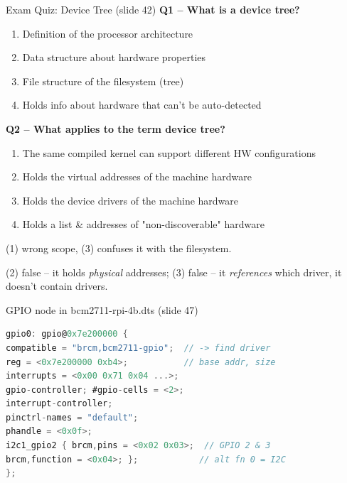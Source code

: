 \begin{example2}{Exam Quiz: Device Tree (slide 42)}
    \textbf{Q1 -- What is a device tree?}
    \begin{enumerate}
        \item Definition of the processor architecture
        \item Data structure about hardware properties
        \item File structure of the filesystem (tree)
        \item Holds info about hardware that can't be auto-detected
    \end{enumerate}
    \textbf{Q2 -- What applies to the term device tree?}
    \begin{enumerate}
        \item The same compiled kernel can support different HW configurations
        \item Holds the virtual addresses of the machine hardware
        \item Holds the device drivers of the machine hardware
        \item Holds a list \& addresses of "non-discoverable" hardware
    \end{enumerate}
    \tcblower
     (1) wrong scope, (3) confuses it with the filesystem.

     (2) false -- it holds \emph{physical} addresses;
    (3) false -- it \emph{references} which driver, it doesn't contain drivers.
\end{example2}

\begin{examplecode}{GPIO node in bcm2711-rpi-4b.dts (slide 47)}
\begin{lstlisting}[language=C, style=basesmol, aboveskip=2pt, belowskip=2pt]
gpio0: gpio@0x7e200000 {
compatible = "brcm,bcm2711-gpio";  // -> find driver
reg = <0x7e200000 0xb4>;           // base addr, size
interrupts = <0x00 0x71 0x04 ...>;
gpio-controller; #gpio-cells = <2>;
interrupt-controller;
pinctrl-names = "default";
phandle = <0x0f>;
i2c1_gpio2 { brcm,pins = <0x02 0x03>;  // GPIO 2 & 3
brcm,function = <0x04>; };            // alt fn 0 = I2C
};
\end{lstlisting}
\end{examplecode}

